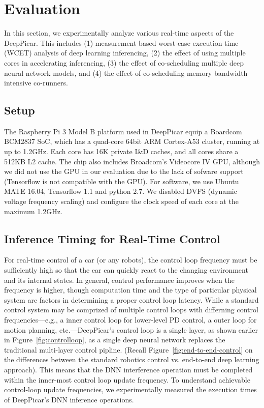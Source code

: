 
\section{Evaluation}\label{sec:evaluation}

In this section, we experimentally analyze various real-time aspects
of the DeepPicar. This includes
(1) measurement based worst-case execution time (WCET) analysis of
deep learning inferencing,
(2) the effect of using multiple cores in accelerating inferencing,
(3) the effect of co-scheduling multiple deep neural network models,
and 
(4) the effect of co-scheduling memory bandwidth intensive co-runners.

\subsection{Setup}

The Raspberry Pi 3 Model B platform used in DeepPicar equip a Boardcom
BCM2837 SoC, which has a quad-core 64bit ARM Cortex-A53 cluster,
running at up to 1.2GHz. Each core has 16K private I\&D caches, and all
cores share a 512KB L2 cache.
The chip also includes Broadcom's Videocore IV
GPU, although we did not use the GPU in our evaluation due to the lack
of sofware support (Tensorflow is not compatible with the GPU).
For software, we use Ubuntu MATE 16.04, Tensorflow 1.1 and python
2.7. We disabled DVFS (dynamic voltage frequency scaling) and
configure the clock speed of each core at the maximum 1.2GHz.

\subsection{Inference Timing for Real-Time Control}

For real-time control of a car (or any robots), the control loop
frequency must be sufficiently high so that the car can quickly
react to the changing environment and its internal states. In general,
control performance improves when the frequency is higher, though
computation time and the type of particular physical system are
factors in determining a proper control loop latency. While a standard
control system may be comprized of multiple control loops with
differning control frequencies---e.g., a inner control loop for lower-level
PD control, a outer loop for motion planning, etc.---DeepPicar's
control loop is a single layer, as shown earlier in
Figure~\ref{fig:controlloop}, as a single deep neural network
replaces the traditional multi-layer control pipline. (Recall
Figure~\ref{fig:end-to-end-control} on the differences between the
standard robotics control vs. end-to-end deep learning approach).
This means that the DNN interference operation must be completed
within the inner-most control loop update frequency. To understand
achievable control-loop update frequencies, we experimentally measured
the execution times of DeepPicar's DNN inference operations.


